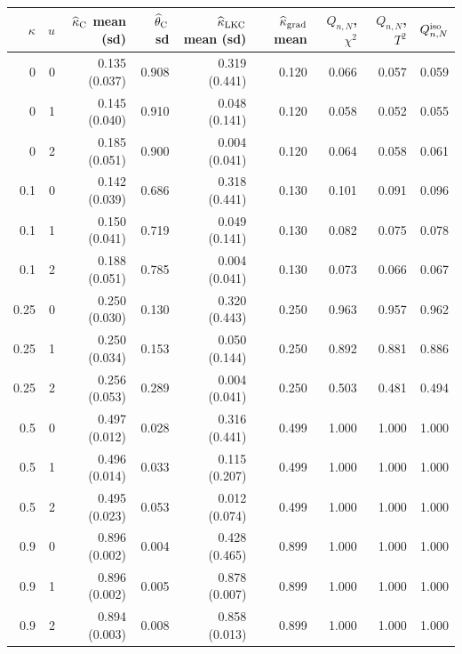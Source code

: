 \begin{tabular}{rrrrrrrrr}
\hline
$\kappa$ & $u$ & $\widehat\kappa_{\rm C}$ mean (sd) & $\widehat\theta_{\rm C}$ sd & $\widehat\kappa_{\rm LKC}$ mean (sd) & $\widehat\kappa_{\rm grad}$ mean & $Q_{n,N}$, $\chi^2$ & $Q_{n,N}$, $T^2$ & $Q^{\rm iso}_{n,N}$ \\
\hline
0 & 0 & 0.135 (0.037) & 0.908 & 0.319 (0.441) & 0.120 & 0.066 & 0.057 & 0.059 \\
0 & 1 & 0.145 (0.040) & 0.910 & 0.048 (0.141) & 0.120 & 0.058 & 0.052 & 0.055 \\
0 & 2 & 0.185 (0.051) & 0.900 & 0.004 (0.041) & 0.120 & 0.064 & 0.058 & 0.061 \\
0.1 & 0 & 0.142 (0.039) & 0.686 & 0.318 (0.441) & 0.130 & 0.101 & 0.091 & 0.096 \\
0.1 & 1 & 0.150 (0.041) & 0.719 & 0.049 (0.141) & 0.130 & 0.082 & 0.075 & 0.078 \\
0.1 & 2 & 0.188 (0.051) & 0.785 & 0.004 (0.041) & 0.130 & 0.073 & 0.066 & 0.067 \\
0.25 & 0 & 0.250 (0.030) & 0.130 & 0.320 (0.443) & 0.250 & 0.963 & 0.957 & 0.962 \\
0.25 & 1 & 0.250 (0.034) & 0.153 & 0.050 (0.144) & 0.250 & 0.892 & 0.881 & 0.886 \\
0.25 & 2 & 0.256 (0.053) & 0.289 & 0.004 (0.041) & 0.250 & 0.503 & 0.481 & 0.494 \\
0.5 & 0 & 0.497 (0.012) & 0.028 & 0.316 (0.441) & 0.499 & 1.000 & 1.000 & 1.000 \\
0.5 & 1 & 0.496 (0.014) & 0.033 & 0.115 (0.207) & 0.499 & 1.000 & 1.000 & 1.000 \\
0.5 & 2 & 0.495 (0.023) & 0.053 & 0.012 (0.074) & 0.499 & 1.000 & 1.000 & 1.000 \\
0.9 & 0 & 0.896 (0.002) & 0.004 & 0.428 (0.465) & 0.899 & 1.000 & 1.000 & 1.000 \\
0.9 & 1 & 0.896 (0.002) & 0.005 & 0.878 (0.007) & 0.899 & 1.000 & 1.000 & 1.000 \\
0.9 & 2 & 0.894 (0.003) & 0.008 & 0.858 (0.013) & 0.899 & 1.000 & 1.000 & 1.000 \\
\hline
\end{tabular}
